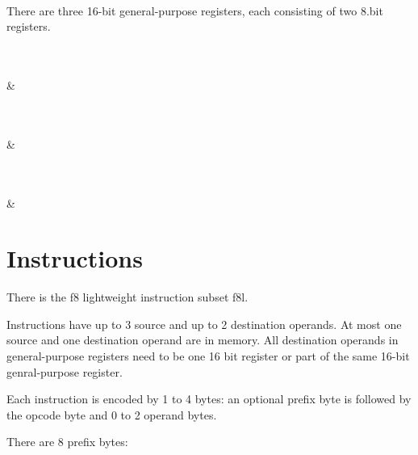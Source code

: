 \documentclass{book}
\begin{document}
\vspace{3mm}
\begin{bytefield}[bitwidth=0.025\linewidth]{16}
	 \\
\end{bytefield}

There are three 16-bit general-purpose registers, each consisting of two 8.bit registers.

\vspace{3mm}
\begin{bytefield}[bitwidth=0.025\linewidth]{16}
	 \\
	 \\
	 &
\end{bytefield}

\vspace{3mm}
\begin{bytefield}[bitwidth=0.025\linewidth]{16}
	 \\
	 \\
	 &
\end{bytefield}

\vspace{3mm}
\begin{bytefield}[bitwidth=0.025\linewidth]{16}
	 \\
	 \\
	 &
\end{bytefield}

\section{Instructions}

There is the f8 lightweight instruction subset f8l.

Instructions have up to 3 source and up to 2 destination operands. At most one source and one destination operand are in memory. All destination operands in general-purpose registers need to be one 16 bit register or part of the same 16-bit genral-purpose register.

Each instruction is encoded by 1 to 4 bytes: an optional prefix byte is followed by the opcode byte and 0 to 2 operand bytes.

There are 8 prefix bytes:
\end{document}
